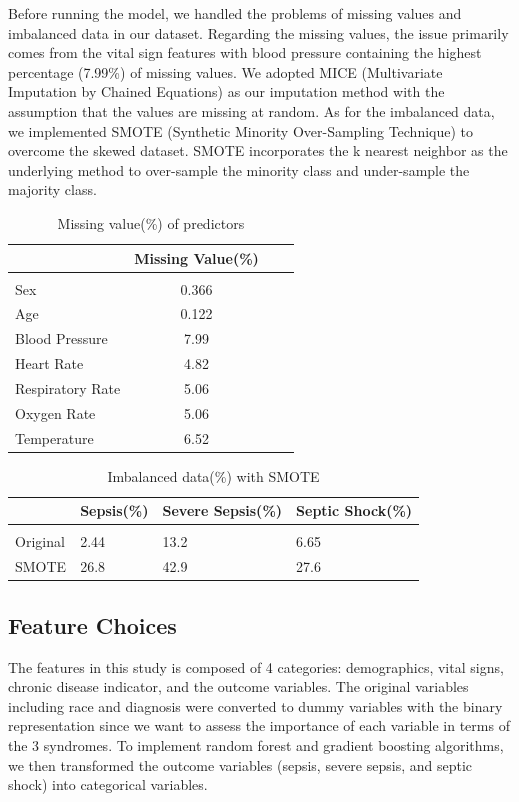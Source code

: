 \documentclass[twoside,11pt]{article}
\begin{document}
Before running the model, we handled the problems of missing values and imbalanced data in our dataset. Regarding the missing values, the issue primarily comes from the vital sign features with blood pressure containing the highest percentage (7.99\%) of missing values. We adopted MICE (Multivariate Imputation by Chained Equations) as our imputation method with the assumption that the values are missing at random. As for the imbalanced data, we implemented SMOTE (Synthetic Minority Over-Sampling Technique) to overcome the skewed dataset. SMOTE incorporates the k nearest neighbor as the underlying method to over-sample the minority class and under-sample the majority class. 

\begin{table}[htbp]
	\centering 
	\begin{tabular}{lclc}
		\hline 
		& Missing Value(\%) \\ 
		\hline \\[-11pt]
		Sex & 0.366\\ 
		Age & 0.122\\
		Blood Pressure & 7.99\\
		Heart Rate & 4.82\\
		Respiratory Rate & 5.06\\
		Oxygen Rate & 5.06\\
		Temperature & 6.52\\
		\hline 
	\end{tabular}
	\label{tab:missing} 
	\caption{Missing value(\%) of predictors} 
\end{table}

\begin{table}[htbp]
	\centering 
	\begin{tabular}{|p{3cm}|p{3cm}|p{3cm}|p{3cm}|}
		\hline 
		& Sepsis(\%) & Severe Sepsis(\%) & Septic Shock(\%)\\ 
		\hline \\[-11pt]
		Original & 2.44 &  13.2 & 6.65 \\ 
		SMOTE & 26.8 &  42.9 & 27.6\\
		\hline 
	\end{tabular}
	\label{tab:imbalance} 
	\caption{Imbalanced data(\%) with SMOTE} 
\end{table}

\subsection{Feature Choices}
The features in this study is composed of 4 categories: demographics, vital signs, chronic disease indicator, and the outcome variables. The original variables including race and diagnosis were converted to dummy variables with the binary representation since we want to assess the importance of each variable in terms of the 3 syndromes. To implement random forest and gradient boosting algorithms, we then transformed the outcome variables (sepsis, severe sepsis, and septic shock) into categorical variables. 
\end{document}

